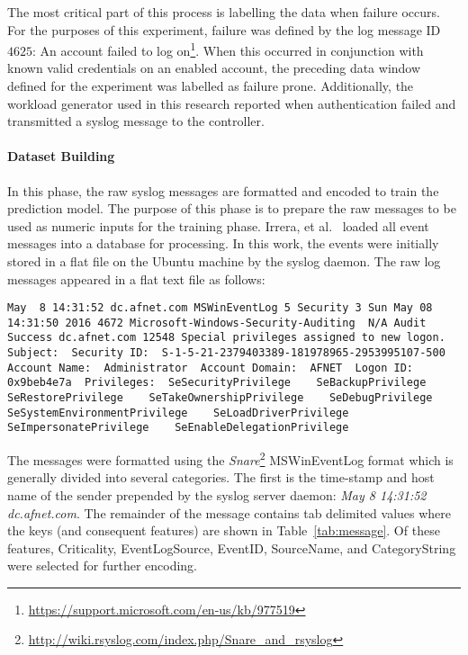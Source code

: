 The most critical part of this process is labelling the data when failure
occurs.  For the purposes of this experiment, failure was defined by the log
message ID $4625$: An account failed to log
on\footnote{\url{https://support.microsoft.com/en-us/kb/977519}}.  When this
occurred in conjunction with known valid credentials on an enabled account, the
preceding data window defined for the experiment was labelled as failure prone.
Additionally, the workload generator used in this research reported when
authentication failed and transmitted a syslog message to the controller.  

\paragraph{Dataset Building} \label{sec:dataset.building}
In this phase, the raw syslog messages are formatted and encoded to train the
prediction model.  The purpose of this phase is to prepare the raw messages to
be used as numeric inputs for the training phase.  Irrera, et
al.~\cite{irrera2015} loaded all event messages into a database for processing.
In this work, the events were initially stored in a flat file on the Ubuntu
machine by the syslog daemon.  The raw log messages appeared in a flat text
file as follows:

\begin{lstlisting}
May  8 14:31:52 dc.afnet.com MSWinEventLog 5 Security 3 Sun May 08 14:31:50 2016 4672 Microsoft-Windows-Security-Auditing  N/A Audit Success dc.afnet.com 12548 Special privileges assigned to new logon.  Subject:  Security ID:  S-1-5-21-2379403389-181978965-2953995107-500  Account Name:  Administrator  Account Domain:  AFNET  Logon ID:  0x9beb4e7a  Privileges:  SeSecurityPrivilege    SeBackupPrivilege    SeRestorePrivilege    SeTakeOwnershipPrivilege    SeDebugPrivilege    SeSystemEnvironmentPrivilege    SeLoadDriverPrivilege    SeImpersonatePrivilege    SeEnableDelegationPrivilege
\end{lstlisting}

The messages were formatted using the
\emph{Snare}\footnote{\url{http://wiki.rsyslog.com/index.php/Snare\_and\_rsyslog}}
MSWinEventLog format which is generally divided into several categories.  The
first is the time-stamp and host name of the sender prepended by the syslog
server daemon: \emph{May 8 14:31:52 dc.afnet.com}.  The remainder of the
message contains tab delimited values where the keys (and consequent features)
are shown in Table~\ref{tab:message}.  Of these features, Criticality,
EventLogSource, EventID, SourceName, and CategoryString were selected for
further encoding.

